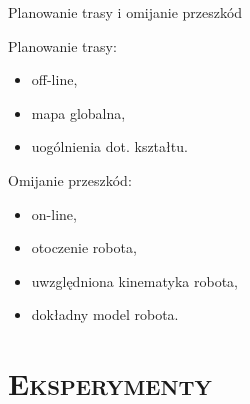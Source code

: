 \documentclass[xcolor=x11names,compress]{beamer}
\renewcommand{\(}{\begin{columns}}
\renewcommand{\)}{\end{columns}}
\newcommand{\<}[1]{\begin{column}{#1}}
\renewcommand{\>}{\end{column}}
\begin{document}
\begin{frame}{Planowanie trasy i omijanie przeszkód}

\alert{Planowanie trasy:}
\begin{itemize}
\item off-line,
\item mapa globalna,
\item uogólnienia dot. kształtu.
\end{itemize}

\vspace{.7cm}

\alert{Omijanie przeszkód:}
\begin{itemize}
\item on-line,
\item otoczenie robota,
\item uwzględniona kinematyka robota,
\item dokładny model robota.
\end{itemize}

\end{frame}

\section{\scshape Eksperymenty}

\end{document}

